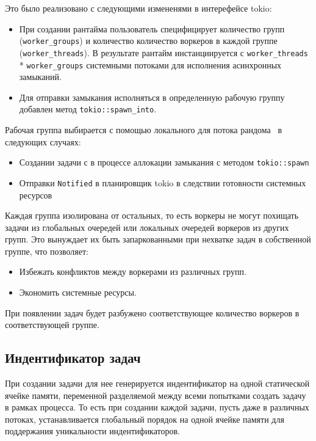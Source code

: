 Это было реализовано с следующими измененями в интерефейсе tokio:

\begin{itemize}

\item При создании рантайма пользователь специфицирует количество групп (\verb|worker_groups|) и количество количество воркеров в каждой группе (\verb|worker_threads|). В результате рантайм инстанциируется с \verb|worker_threads| * \verb|worker_groups| системными потоками для исполнения асинхронных замыканий.
\item Для отправки замыкания исполняться в определенную рабочую группу добавлен метод \verb|tokio::spawn_into|.
\end{itemize}


Рабочая группа выбирается с помощью локального для потока рандома~\cite{xorshiftRNG} в следующих случаях:

\begin{itemize}
    \item Создании задачи с в процессе аллокации замыкания с методом \verb|tokio::spawn|
    \item Отправки \verb|Notified| в планировщик tokio в следствии готовности системных ресурсов
\end{itemize}

Каждая группа изолирована от остальных, то есть воркеры не могут похищать задачи из глобальных очередей или локальных очередей воркеров из других групп. Это вынуждает их быть запаркованными при нехватке задач в собственной группе, что позволяет:

\begin{itemize}
    \item Избежать конфликтов между воркерами из различных групп.
    \item Экономить системные ресурсы.
\end{itemize}

При появлении задач будет разбужено соответствующее количество воркеров в соответствующей группе.

\subsection{Индентификатор задач}

При создании задачи для нее генерируется индентификатор на одной статической ячейке памяти, переменной разделяемой между всеми попытками создать задачу в рамках процесса. То есть при создании каждой задачи, пусть даже в различных потоках, устанавливается глобальный порядок на одной ячейке памяти для поддержания уникальности индентификаторов.

